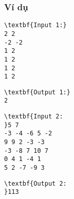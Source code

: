 \subsubsection{Ví dụ}
\begin{itemize}
\end{itemize}
\begin{verbatim}
\textbf{Input 1:}
2 2
-2 -2
1 2
1 2
1 2
1 2 \end{verbatim}
\begin{verbatim}
\textbf{Output 1:}
2
\end{verbatim}
\begin{verbatim}
\textbf{Input 2:
}5 7
-3 -4 -6 5 -2
9 9 2 -3 -3
-3 -8 7 10 7
0 4 1 -4 1
5 2 -7 -9 3
\end{verbatim}
\begin{verbatim}
\textbf{Output 2:
}113\end{verbatim}